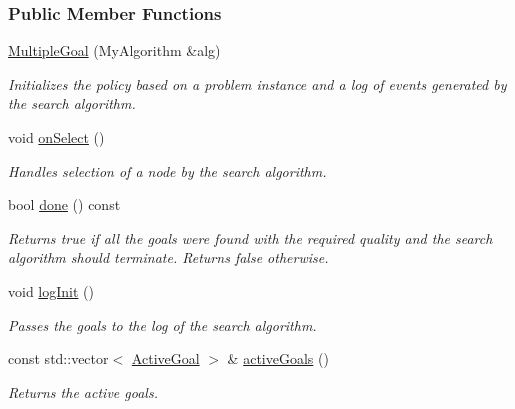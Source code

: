 \subsubsection*{Public Member Functions}
\begin{DoxyCompactItemize}
\item 
\hyperlink{structgoalHandler_1_1MultipleGoal_a0b9632facfb7f6acfcb4a4a6164f6c1c}{Multiple\+Goal} (My\+Algorithm \&alg)
\begin{DoxyCompactList}\small\item\em Initializes the policy based on a problem instance and a log of events generated by the search algorithm. \end{DoxyCompactList}\item 
void \hyperlink{structgoalHandler_1_1MultipleGoal_a0c3f5a1ba95fefb8ff6954941742b12d}{on\+Select} ()\hypertarget{structgoalHandler_1_1MultipleGoal_a0c3f5a1ba95fefb8ff6954941742b12d}{}\label{structgoalHandler_1_1MultipleGoal_a0c3f5a1ba95fefb8ff6954941742b12d}

\begin{DoxyCompactList}\small\item\em Handles selection of a node by the search algorithm. \end{DoxyCompactList}\item 
bool \hyperlink{structgoalHandler_1_1MultipleGoal_aae31516925de263d3e1ba44be2f0d11a}{done} () const 
\begin{DoxyCompactList}\small\item\em Returns {\ttfamily true} if all the goals were found with the required quality and the search algorithm should terminate. Returns {\ttfamily false} otherwise. \end{DoxyCompactList}\item 
void \hyperlink{structgoalHandler_1_1MultipleGoal_a83113b042a0fbde792078c7763b1537e}{log\+Init} ()
\begin{DoxyCompactList}\small\item\em Passes the goals to the log of the search algorithm. \end{DoxyCompactList}\item 
const std\+::vector$<$ \hyperlink{structgoalHandler_1_1MultipleGoal_a8fd8f62fd989f66b55abbed77c1d3bc9}{Active\+Goal} $>$ \& \hyperlink{structgoalHandler_1_1MultipleGoal_a2aa5e60b92dd7cf5219ac354a730c2f2}{active\+Goals} ()
\begin{DoxyCompactList}\small\item\em Returns the active goals. \end{DoxyCompactList}\end{DoxyCompactItemize}
